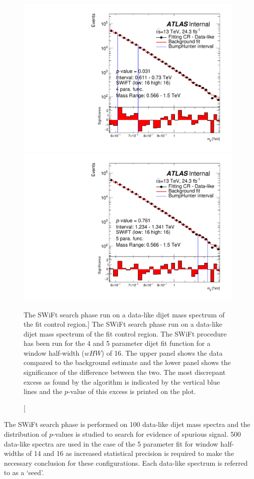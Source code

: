 \begin{figure}[!htb]
\captionsetup[subfigure]{aboveskip=0pt,justification=centering}
\centering
{} {
  \includegraphics[width=0.45\linewidth, angle=0]{figs/Dibjet/LowMass/FitStudy_min566/bhFit_corrFitCR_dataLike_v13_4para_low16_high16.pdf}
}
 {
  \includegraphics[width=0.45\linewidth, angle=0]{figs/Dibjet/LowMass/FitStudy_min566/bhFit_corrFitCR_dataLike_v13_5para_low16_high16.pdf}
}
\caption
    [The SWiFt search phase run on a data-like dijet mass spectrum of the \lm{} fit control region.]
    {\label{fig:bhFit_lm_corrFitCR_dataLike}
      The SWiFt search phase run on a data-like dijet mass spectrum of the \lm{} fit control region.
      The SWiFt procedure has been run for the 4 and 5 parameter dijet fit function for a window half-width ($wHW$) of 16.
      The upper panel shows the data compared to the background estimate and the lower panel shows the significance of the difference between the two.
      The most discrepant excess as found by the \bh{} algorithm is indicated by the vertical blue lines and the \mbox{$p$-value} of this excess is printed on the plot. 
}
\end{figure}

The SWiFt search phase is performed on 100 data-like dijet mass spectra and the distribution of \bh{} \mbox{$p$-value}s is studied to search for evidence of spurious signal.
500 data-like spectra are used in the case of the 5 parameter fit for window half-widths of 14 and 16
as increased statistical precision is required to make the necessary conclusion for these configurations.
Each data-like spectrum is referred to as a `seed'. %

